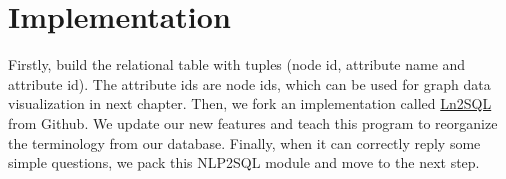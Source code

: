 \section{Implementation}
\vspace{-10pt}
Firstly, build the relational table with tuples (node id, attribute name and attribute id). The attribute ids are node ids, which can be used for graph data visualization in next chapter. Then, we fork an implementation called \href{https://github.com/FerreroJeremy/ln2sql}{Ln2SQL} from Github. We update our new features and teach this program to reorganize the terminology from our database. Finally, when it can correctly reply some simple questions, we pack this NLP2SQL module and move to the next step.
 